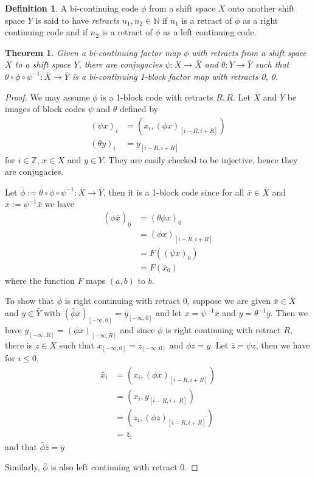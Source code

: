 \documentclass[a4paper]{amsart}
\newtheorem{theorem}{Theorem}[section]
\theoremstyle{definition}
\newtheorem{definition}{Definition}[section]
\numberwithin{equation}{section}
\numberwithin{figure}{section}
\theoremstyle{definition}
\theoremstyle{remark}
\begin{document}
\begin{definition}
  A bi-continuing code $\phi$ from a shift space $X$  onto another shift space $Y$ is said to have \emph{retracts} $n_1, n_2 \in {\mathbb{N}}$ if $n_1$ is a retract of $\phi$ as a right continuing code and if $n_2$ is a retract of $\phi$ as a left continuing code.
\end{definition}

\begin{theorem} 
  Given a bi-continuing factor map $ \phi $  with retracts from a shift space $X$ to a shift space $Y$,
  there are conjugacies $ \psi : X \to \bar X $ and $ \theta : Y \to \bar Y $
  such that $ \theta \circ \phi \circ \psi^{-1} : \bar X \to \bar Y $ is a bi-continuing 1-block factor map with retracts 0, 0.
\end{theorem}
\begin{proof}
  We may assume $\phi$ is a 1-block code with retracts $R, R$.
  Let $\bar X$ and $\bar Y$ be images of block codes $\psi$ and $\theta$ defined by
  \begin{align*}
    (\psi x)_i &= (x_i, (\phi x)_{[i-R,i+R]}) \\
    (\theta y)_i &= y_{[i-R,i+R]}
  \end{align*}
  for $i\in {\mathbb{Z}}$, $x \in X$ and $y \in Y$.
  They are easily checked to be injective, hence they are conjugacies.
  
  Let $ \bar\phi := \theta \circ \phi \circ \psi^{-1} : \bar X \to \bar Y $, then it is a 1-block code since for all $ \bar x \in \bar X $ and $ x := \psi^{-1}\bar x $ we have
  \begin{align*}
    (\bar\phi\bar x)_0 &= (\theta \phi x)_0 \\
    &= (\phi x)_{[i-R,i+R]} \\
    &= F((\psi x)_0) \\
    &= F(\bar x_0)
  \end{align*}
  where the function $F$ maps $ (a,b) $ to $b$.

  To show that $\bar \phi$ is right continuing with retract 0, suppose we are given $ \bar x \in \bar X $ and $ \bar y \in \bar Y $ with $ (\bar \phi \bar x)_{[-\infty,0]} = \bar y_{[-\infty,0]} $ and let $ x = \psi^{-1} \bar x $ and $ y = \theta^{-1} \bar y $. Then we have $ y_{[-\infty,R]} = (\phi x)_{[-\infty,R]} $ and since $ \phi $ is right continuing with retract $R$, there is $ z \in X $ such that $ x_{[-\infty,0]} = z_{[-\infty,0]} $  and $ \phi z = y $. Let $ \bar z = \psi z $, then we have for $i \le 0$, 
  \begin{align*}
    \bar x_i &= (x_i, (\phi x)_{[i-R,i+R]}) \\
    &= (x_i, y_{[i-R,i+R]}) \\
    &= (z_i, (\phi z)_{[i-R,i+R]}) \\
    &= \bar z_i
  \end{align*}
  and that $ \bar \phi \bar z = \bar y $ 

  Similarly, $\bar \phi$ is also left continuing with retract 0.
\end{proof}
\end{document}
